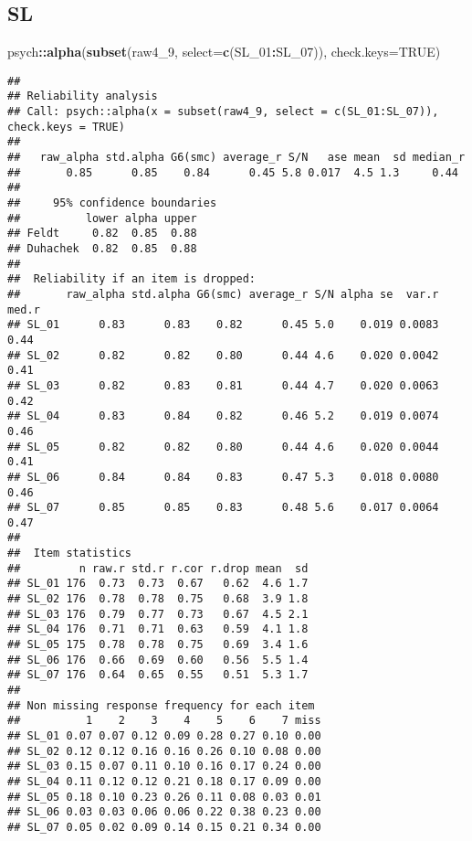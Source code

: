 \documentclass[
]{article}
\newenvironment{Shaded}{\begin{snugshade}}{\end{snugshade}}
\newcommand{\AttributeTok}[1]{\textcolor[rgb]{0.13,0.29,0.53}{#1}}
\newcommand{\ConstantTok}[1]{\textcolor[rgb]{0.56,0.35,0.01}{#1}}
\newcommand{\FunctionTok}[1]{\textcolor[rgb]{0.13,0.29,0.53}{\textbf{#1}}}
\newcommand{\NormalTok}[1]{#1}
\newcommand{\SpecialCharTok}[1]{\textcolor[rgb]{0.81,0.36,0.00}{\textbf{#1}}}
\begin{document}
\subsection{SL}\label{sl}

\begin{Shaded}
\begin{Highlighting}[]
\NormalTok{psych}\SpecialCharTok{::}\FunctionTok{alpha}\NormalTok{(}\FunctionTok{subset}\NormalTok{(raw4\_9, }\AttributeTok{select=}\FunctionTok{c}\NormalTok{(SL\_01}\SpecialCharTok{:}\NormalTok{SL\_07)), }\AttributeTok{check.keys=}\ConstantTok{TRUE}\NormalTok{)}
\end{Highlighting}
\end{Shaded}

\begin{verbatim}
## 
## Reliability analysis   
## Call: psych::alpha(x = subset(raw4_9, select = c(SL_01:SL_07)), check.keys = TRUE)
## 
##   raw_alpha std.alpha G6(smc) average_r S/N   ase mean  sd median_r
##       0.85      0.85    0.84      0.45 5.8 0.017  4.5 1.3     0.44
## 
##     95% confidence boundaries 
##          lower alpha upper
## Feldt     0.82  0.85  0.88
## Duhachek  0.82  0.85  0.88
## 
##  Reliability if an item is dropped:
##       raw_alpha std.alpha G6(smc) average_r S/N alpha se  var.r med.r
## SL_01      0.83      0.83    0.82      0.45 5.0    0.019 0.0083  0.44
## SL_02      0.82      0.82    0.80      0.44 4.6    0.020 0.0042  0.41
## SL_03      0.82      0.83    0.81      0.44 4.7    0.020 0.0063  0.42
## SL_04      0.83      0.84    0.82      0.46 5.2    0.019 0.0074  0.46
## SL_05      0.82      0.82    0.80      0.44 4.6    0.020 0.0044  0.41
## SL_06      0.84      0.84    0.83      0.47 5.3    0.018 0.0080  0.46
## SL_07      0.85      0.85    0.83      0.48 5.6    0.017 0.0064  0.47
## 
##  Item statistics 
##         n raw.r std.r r.cor r.drop mean  sd
## SL_01 176  0.73  0.73  0.67   0.62  4.6 1.7
## SL_02 176  0.78  0.78  0.75   0.68  3.9 1.8
## SL_03 176  0.79  0.77  0.73   0.67  4.5 2.1
## SL_04 176  0.71  0.71  0.63   0.59  4.1 1.8
## SL_05 175  0.78  0.78  0.75   0.69  3.4 1.6
## SL_06 176  0.66  0.69  0.60   0.56  5.5 1.4
## SL_07 176  0.64  0.65  0.55   0.51  5.3 1.7
## 
## Non missing response frequency for each item
##          1    2    3    4    5    6    7 miss
## SL_01 0.07 0.07 0.12 0.09 0.28 0.27 0.10 0.00
## SL_02 0.12 0.12 0.16 0.16 0.26 0.10 0.08 0.00
## SL_03 0.15 0.07 0.11 0.10 0.16 0.17 0.24 0.00
## SL_04 0.11 0.12 0.12 0.21 0.18 0.17 0.09 0.00
## SL_05 0.18 0.10 0.23 0.26 0.11 0.08 0.03 0.01
## SL_06 0.03 0.03 0.06 0.06 0.22 0.38 0.23 0.00
## SL_07 0.05 0.02 0.09 0.14 0.15 0.21 0.34 0.00
\end{verbatim}
\end{document}
